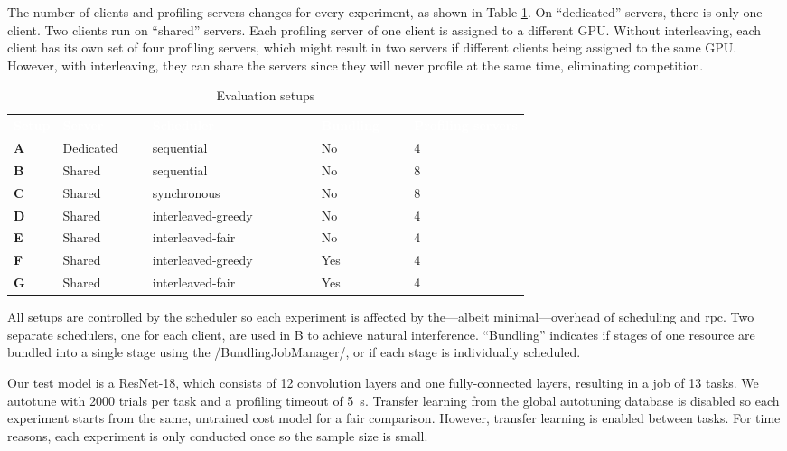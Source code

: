 The number of clients and profiling servers changes for every experiment, as shown in Table \ref{tab:tvm-evaluation-setups}. On \enquote{dedicated} servers, there is only one client. Two clients run on \enquote{shared} servers. Each profiling server of one client is assigned to a different GPU. Without interleaving, each client has its own set of four profiling servers, which might result in two servers if different clients being assigned to the same GPU. However, with interleaving, they can share the servers since they will never profile at the same time, eliminating competition.
\begin{table}
	\newcommand\heading[1]{\textcolor{white}{\textbf{#1}}}
	\renewcommand{\arraystretch}{1.2}
	\sffamily
	\centering
	\begin{tabularx}{\textwidth}{l l l l X}
	\rowcolor{black} \heading{Setup} & \heading{Server~~~~~} & \heading{Scheduler~~~~~~~~~~~~~} & \heading{Bundling~~~} & \heading{Profiling servers} \vspace{2pt} \\
	\textbf{A} & Dedicated & sequential & No & 4 \\
	\textbf{B} & Shared & sequential & No & 8 \\
	\textbf{C} & Shared & synchronous & No & 8 \\
	\textbf{D} & Shared & interleaved-greedy & No & 4 \\
	\textbf{E} & Shared & interleaved-fair & No & 4 \\
	\textbf{F} & Shared & interleaved-greedy & Yes & 4 \\
	\textbf{G} & Shared & interleaved-fair & Yes & 4 \\
	\end{tabularx}
	\caption{Evaluation setups}
	\label{tab:tvm-evaluation-setups}
\end{table}

All setups are controlled by the scheduler so each experiment is affected by the---albeit minimal---overhead of scheduling and \gls{rpc}. Two separate schedulers, one for each client, are used in B to achieve natural interference. \enquote{Bundling} indicates if stages of one resource are bundled into a single stage using the \pythoninline/BundlingJobManager/, or if each stage is individually scheduled.

Our test model is a ResNet-18, which consists of 12 convolution layers and one fully-connected layers, resulting in a job of 13 tasks. We autotune with 2000 trials per task and a profiling timeout of \SI{5}{\second}. Transfer learning from the global autotuning database is disabled so each experiment starts from the same, untrained cost model for a fair comparison. However, transfer learning is enabled between tasks. For time reasons, each experiment is only conducted once so the sample size is small.


